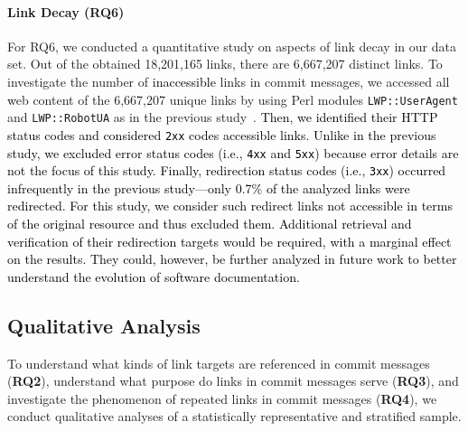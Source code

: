\documentclass[smallextended]{svjour3}       %
\newcommand{\fix}[1]{\textcolor{black}{#1}}
\newcommand{\minor}[1]{\textcolor{black}{#1}}
\begin{document}
\paragraph{Link Decay (RQ6)} For RQ6, we conducted a quantitative study on aspects of link decay in our data set. Out of the obtained 18,201,165 links, there are 6,667,207 distinct links. To investigate the number of \minor{inaccessible} links in commit messages, we accessed all \fix{w}eb content of the 6,667,207 unique links by using Perl modules \texttt{LWP::UserAgent} and \texttt{LWP::RobotUA} as in the previous study~\citep{hata20199}.
\minor{Then, we identified their HTTP status codes and considered \texttt{2xx} codes accessible links. Unlike in the previous study, we excluded error status codes (i.e., \texttt{4xx} and \texttt{5xx}) because error details are not the focus of this study.}
\minor{Finally, redirection status codes (i.e., \texttt{3xx}) occurred infrequently in the previous study---only 0.7\% of the analyzed links were redirected.
For this study, we consider such redirect links not accessible in terms of the original resource and thus excluded them.
Additional retrieval and verification of their redirection targets would be required, with a marginal effect on the results.
They could, however, be further analyzed in future work to better understand the evolution of software documentation.}


\subsection{Qualitative Analysis}
\label{sec:qa}



To understand what kinds of link targets are referenced in commit messages (\textbf{RQ2}), understand what purpose do links in commit messages serve (\textbf{RQ3}), and investigate the phenomenon of repeated links in commit messages (\textbf{RQ4}), we conduct qualitative analyses of a statistically representative and stratified sample. 
\end{document}
